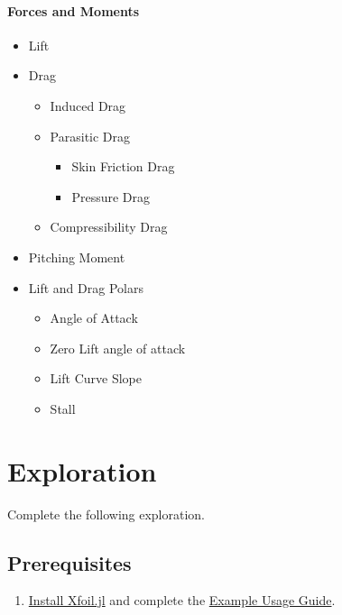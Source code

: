 \documentclass[11pt,twocolumn]{article}
\begin{document}
\paragraph{Forces and Moments}
\begin{itemize}
	\item Lift
	\item Drag
	\begin{itemize}
		\item Induced Drag
		\item Parasitic Drag
		\begin{itemize}
			\item Skin Friction Drag
			\item Pressure Drag
		\end{itemize}
		\item Compressibility Drag
	\end{itemize}
	\item Pitching Moment
	\item Lift and Drag Polars
	\begin{itemize}
		\item Angle of Attack
		\item Zero Lift angle of attack
		\item Lift Curve Slope
		\item Stall
	\end{itemize}
\end{itemize}




\section{Exploration}
\label{sec:exploration}

Complete the following exploration.

\subsection{Prerequisites}
\label{ssec:prereqs}

\begin{enumerate}[label=\roman*.]
	\item \href{https://flow.byu.edu/Xfoil.jl/stable/#Installation}{Install Xfoil.jl} and complete the \href{https://flow.byu.edu/Xfoil.jl/stable/guide/}{Example Usage Guide}.
\end{enumerate}
\end{document}
